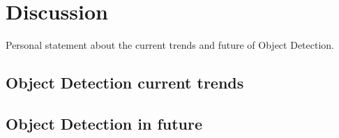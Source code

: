 \documentclass[12pt]{report}
\begin{document}

\chapter{Discussion}
Personal statement about the current trends and future of Object Detection.

\newpage

\section{Object Detection current trends}

\section{Object Detection in future}


\printbibliography[title=References]
\end{document}
